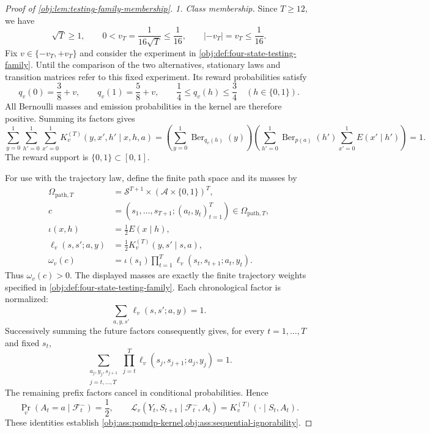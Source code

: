 \documentclass[11pt]{article}
\begin{document}
\begin{proof}[Proof of \cref{obj:lem:testing-family-membership}]
\emph{1. Class membership.}
Since \(T\geq12\), we have
\[
\sqrt T\geq1,\qquad
0<v_T=\frac{1}{16\sqrt T}\leq\frac1{16},
\qquad
|-v_T|=v_T\leq\frac1{16}.
\]
Fix \(v\in\{-v_T,+v_T\}\) and consider the experiment in
\cref{obj:def:four-state-testing-family}. Until the comparison of the two alternatives, stationary laws and transition matrices refer to this fixed experiment. Its reward probabilities satisfy
\[
q_v(0)=\frac38+v,\qquad q_v(1)=\frac58+v,
\qquad
\frac14\leq q_v(h)\leq\frac34
\quad(h\in\{0,1\}).
\]
All Bernoulli masses and emission probabilities in the kernel are therefore positive. Summing its factors gives
\[
\sum_{y=0}^1\sum_{h'=0}^1\sum_{x'=0}^1
K_v^{(T)}(y,x',h'\mid x,h,a)
=
\left(\sum_{y=0}^1\operatorname{Ber}_{q_v(h)}(y)\right)
\left(\sum_{h'=0}^1\operatorname{Ber}_{p(a)}(h')
      \sum_{x'=0}^1E(x'\mid h')\right)
=1.
\]
The reward support is \(\{0,1\}\subset[0,1]\).

For use with the trajectory law, define the finite path space and its masses by
\[
\begin{aligned}
\Omega_{\mathrm{path},T}
&=\mathcal S^{T+1}\times(\mathcal A\times\{0,1\})^T,\\
c&=(s_1,\ldots,s_{T+1};(a_t,y_t)_{t=1}^T)
   \in\Omega_{\mathrm{path},T},\\
\iota(x,h)&=\frac12E(x\mid h),\\
\ell_v(s,s';a,y)&=\frac12K_v^{(T)}(y,s'\mid s,a),\\
\omega_v(c)&=\iota(s_1)\prod_{t=1}^T
                     \ell_v(s_t,s_{t+1};a_t,y_t).
\end{aligned}
\]
Thus \(\omega_v(c)>0\). The displayed masses are exactly the finite trajectory weights specified in
\cref{obj:def:four-state-testing-family}. Each chronological factor is normalized:
\[
\sum_{a,y,s'}\ell_v(s,s';a,y)=1.
\]
Successively summing the future factors consequently gives, for every \(t=1,\ldots,T\) and fixed \(s_t\),
\[
\sum_{\substack{a_j,y_j,s_{j+1}\\j=t,\ldots,T}}
\prod_{j=t}^T\ell_v(s_j,s_{j+1};a_j,y_j)=1.
\]
The remaining prefix factors cancel in conditional probabilities. Hence
\[
\Pr_v(A_t=a\mid\mathcal F_t^-)=\frac12,
\qquad
\mathcal L_v(Y_t,S_{t+1}\mid\mathcal F_t^-,A_t)
=K_v^{(T)}(\cdot\mid S_t,A_t).
\]
These identities establish
\cref{obj:ass:pomdp-kernel,obj:ass:sequential-ignorability}.


\end{proof}
\end{document}
